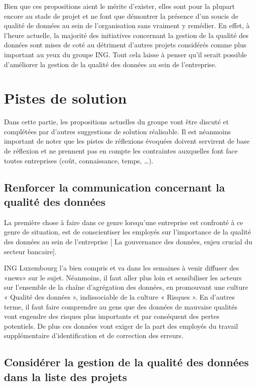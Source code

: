 \documentclass[a4paper, 12pt, french]{article}
\begin{document}
Bien que ces propositions aient le mérite d’exister, elles sont pour la plupart encore au stade de projet et ne font que démontrer la présence d'un soucis de qualité de données au sein de l’organisation sans vraiment y remédier. En effet, à l’heure actuelle, la majorité des initiatives concernant la gestion de la qualité des données sont mises de coté au détriment d’autres projets considérés comme plus important au yeux du groupe ING. Tout cela laisse à penser qu’il serait possible d’améliorer la gestion de la qualité des données au sein de l’entreprise. \\

\section{Pistes de solution}

Dans cette partie, les propositions actuelles du groupe vont être discuté et complétées par d'autres suggestions de solution réalisable. Il est néanmoins important de noter que les pistes de réflexions évoquées doivent servirent de base de réflexion et ne prennent pas en compte les contraintes auxquelles font face toutes entreprises (coût, connaissance, temps, …). 

\subsection{Renforcer la communication concernant la qualité des données}

La première chose à faire dans ce genre lorsqu'une entreprise est confronté à ce genre de situation, est de conscientiser les employés sur l’importance de la qualité des données au sein de l’entreprise [
La gouvernance des données, enjeu crucial du secteur bancaire]. 

ING Luxembourg l’a bien compris et va dans les semaines à venir diffuser des «news» sur le sujet. Néanmoins, il faut aller plus loin et sensibiliser les acteurs sur l’ensemble de la chaîne d’agrégation des données, en promouvant une culture « Qualité des données », indissociable de la culture « Risques ». En d’autres terme, il faut faire comprendre au gens que des données de mauvaise qualités vont engendre des risques plus importants et par conséquent des pertes potentiels. De plus ces données vont exiger de la part des employés du travail supplémentaire d’identification et de correction des erreurs. 

\subsection{Considérer la gestion de la qualité des données dans la liste des projets}
\end{document}
